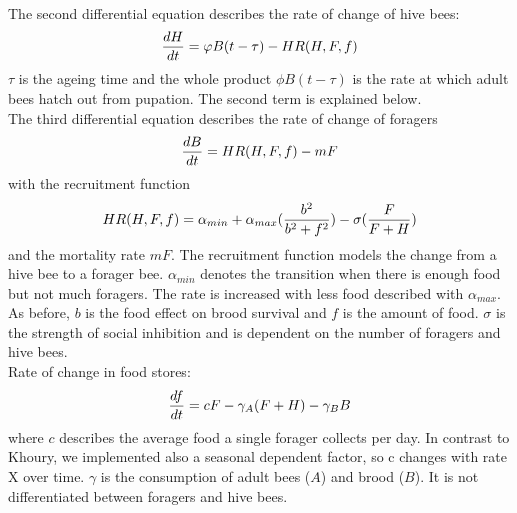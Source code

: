 \\
The second differential equation describes the rate of change of hive bees:
\begin{equation}
{dH \over dt}=\phi B(t-\tau)-HR(H,F,f)
\end{equation}
$\tau$ is the ageing time and the whole product $\phi B(t-\tau)$ is the rate at which adult bees hatch out from pupation. The second term is explained below.\\ 
The third differential equation describes the rate of change of foragers  
\begin{equation}\label{Rate of change of foragers}
{dB \over dt} = HR(H,F,f)-m F
\end{equation}
with the recruitment function 
\begin{equation}\label{rate of change of foragers }
HR(H,F,f) = \alpha_{min} + \alpha_{max}({b^2 \over b^2+f^2})-\sigma({F \over F+H})
\end{equation}
and the mortality rate $mF$. The recruitment function models the change from a hive bee to a forager bee. $\alpha_{min}$ denotes the transition when there is enough food but not much foragers. The rate is increased with less food described with $\alpha_{max}$. As before, $b$ is the food effect on brood survival and $f$ is the amount of food. $\sigma$ is the strength of social inhibition and is dependent on the number of foragers and hive bees.\\
Rate of change in food stores:
\begin{equation}\label{Rate of change in food stores}
{df \over dt} = c F - \gamma_A (F+H) - \gamma_B B
\end{equation}
where $c$ describes the average food a single forager collects per day. In contrast to Khoury, we implemented also a seasonal dependent factor, so c changes with rate X over time. $\gamma$ is the consumption of adult bees ($A$) and brood ($B$). It is not differentiated between foragers and hive bees.  




